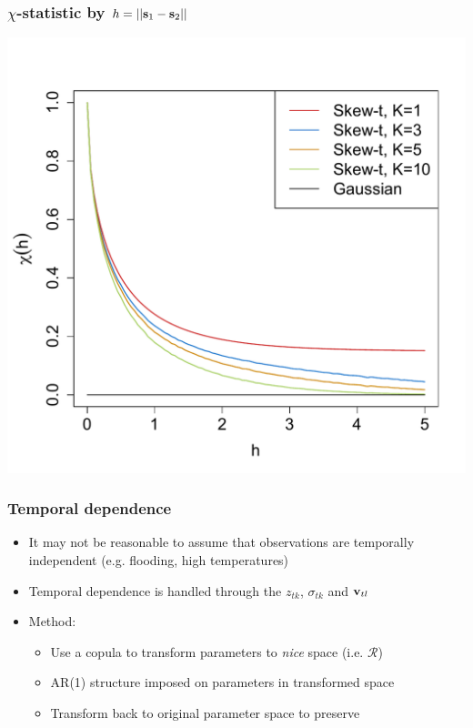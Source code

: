 \documentclass{beamer}
\begin{document}
 \begin{frame}\frametitle{$\chi$-statistic by $h=||\mathbf{s}_1-\mathbf{s}_2||$}
 	\begin{center}
 		\includegraphics[height=0.8\textheight]{plots/chi-h}
 	\end{center}
 \end{frame}

 \begin{frame}\frametitle{Temporal dependence}
 	\begin{itemize}\setlength\itemsep{1em}
 	\item It may not be reasonable to assume that observations are temporally independent (e.g. flooding, high temperatures)
 	\item Temporal dependence is handled through the $z_{tk}$, $\sigma_{tk}$ and $\mathbf{v}_{tl}$
 	\item Method:
 	\begin{itemize}\setlength\itemsep{0.5em}
 	\item Use a copula to transform parameters to \emph{nice} space (i.e. $\mathcal{R}$)
 	\item AR(1) structure imposed on parameters in transformed space
 	\item Transform back to original parameter space to preserve \skewt{}
 	\end{itemize}
 	\end{itemize}
 \end{frame}
\end{document}
